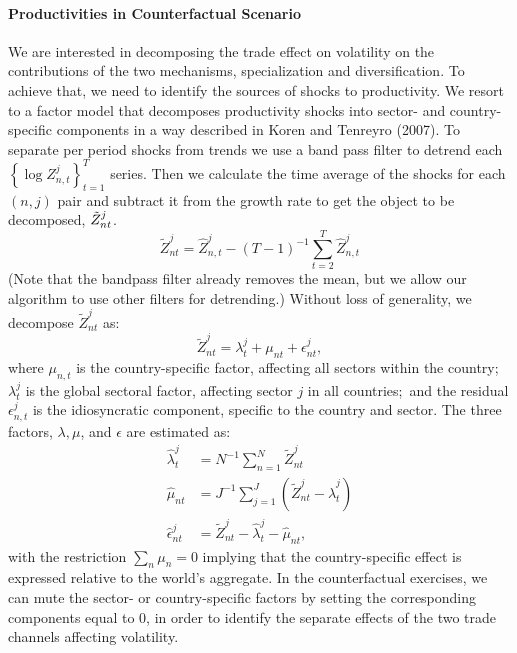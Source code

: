 \documentclass[12pt]{article}
\begin{document}
\paragraph{Productivities in Counterfactual Scenario}

We are interested in decomposing the trade effect on volatility on the
contributions of the two mechanisms, specialization and diversification. To
achieve that, we need to identify the sources of shocks to productivity. We
resort to a factor model that decomposes productivity shocks into sector-
and country-specific components in a way described in Koren and Tenreyro
(2007). To separate per period shocks from trends we use a band pass filter
to detrend each $\left\{ \log {Z_{n,t}^{j}}\right\} _{t=1}^{T}$ series. Then
we calculate the time average of the shocks for each $(n,j)$ pair and
subtract it from the growth rate to get the object to be decomposed, $\tilde{%
Z}_{nt}^{j}$. 
\begin{equation*}
\tilde{Z}_{nt}^{j}=\hat{Z}_{n,t}^{j}-(T-1)^{-1}\sum_{t=2}^{T}\hat{Z}%
_{n,t}^{j}
\end{equation*}
(Note that the bandpass filter already removes the mean, but we allow our
algorithm to use other filters for detrending.) Without loss of generality,
we decompose $\tilde{Z}_{nt}^{j}$ as: 
\begin{equation*}
\tilde{Z}_{nt}^{j}=\lambda _{t}^{j}+\mu _{nt}+\epsilon _{nt}^{j},
\end{equation*}%
where ${\mu _{n,t}}$ is the country-specific factor, affecting all sectors
within the country; $\lambda _{t}^{j}$ is the global sectoral factor,
affecting sector $j$ in all countries;\ and the residual $\epsilon
_{n,t}^{j} $ is the idiosyncratic component, specific to the country and
sector. The three factors, $\lambda ,\mu $, and $\epsilon $ are estimated
as: 
\begin{align*}
\hat{\lambda}_{t}^{j}& =N^{-1}\sum_{n=1}^{N}\tilde{Z}_{nt}^{j} \\
\hat{\mu}_{nt}& =J^{-1}\sum_{j=1}^{J}\left( \tilde{Z}_{nt}^{j}-\hat{\lambda}%
_{t}^{j}\right) \\
\hat{\epsilon}_{nt}^{j}& =\tilde{Z}_{nt}^{j}-\hat{\lambda}_{t}^{j}-\hat{\mu}%
_{nt}\text{,}
\end{align*}%
with the restriction $\sum_{n}{\mu _{n}}=0$ implying that the
country-specific effect is expressed relative to the world's aggregate. In
the counterfactual exercises, we can mute the sector- or country-specific
factors by setting the corresponding components equal to 0, in order to
identify the separate effects of the two trade channels affecting
volatility.\bigskip
\end{document}
